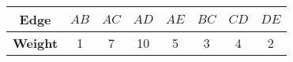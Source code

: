 \documentclass{standalone}
\begin{document}
    \begin{tabular}{cccccccc}\toprule
        \textbf{Edge} & $AB$&$AC$&$AD$&$AE$&$BC$&$CD$&$DE$\\ \midrule
        \textbf{Weight}&1&7&10&5&3&4&2\\
   \bottomrule
    \end{tabular}
\end{document}
